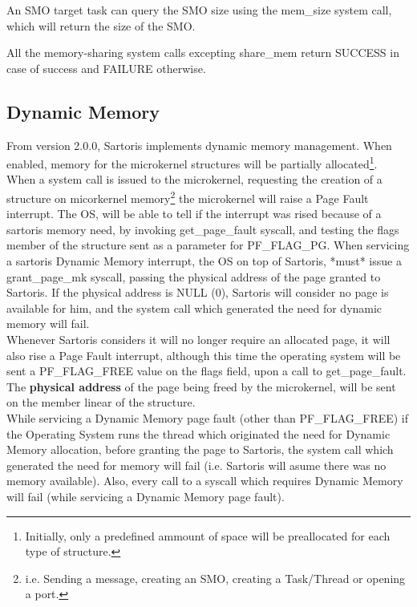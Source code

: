 \documentclass[11pt, letterpaper, twoside, english]{book}
\begin{document}
An SMO target task can query the SMO size using the \textsf{mem\_size} system call, which will return the size of the SMO.

All the memory-sharing system calls excepting \textsf{share\_mem} return SUCCESS in case of success and FAILURE otherwise.

\subsection{Dynamic Memory} \label{sec:dynamicmemory}

From version \textsf{2.0.0}, Sartoris implements dynamic memory management. When enabled, memory for the microkernel structures will be partially allocated\footnote{Initially, only a predefined ammount of space will be preallocated for each type of structure.}.\\

When a system call is issued to the microkernel, requesting the creation of a structure on micorkernel memory\footnote{i.e. Sending a message, creating an SMO, creating a Task/Thread or opening a port.} the microkernel will raise a Page Fault interrupt. The OS, will be able to tell if the interrupt was rised because of a sartoris memory need, by invoking \textsf{get\_page\_fault} syscall, and testing the flags member of the structure sent as a parameter for \textsf{PF\_FLAG\_PG}. When servicing a sartoris Dynamic Memory interrupt, the OS on top of Sartoris, *must* issue a \textsf{grant\_page\_mk} syscall, passing the physical address of the page granted to Sartoris. If the physical address is NULL (0), Sartoris will consider no page is available for him, and the system call which generated the need for dynamic memory will fail.\\ 
Whenever Sartoris considers it will no longer require an allocated page, it will also rise a Page Fault interrupt, although this time the operating system will be sent a \textsf{PF\_FLAG\_FREE} value on the \textsf{flags} field, upon a call to \textsf{get\_page\_fault}. The \textbf{physical address} of the page being freed by the microkernel, will be sent on the member \textsf{linear} of the structure.\\

While servicing a Dynamic Memory page fault (other than \textsf{PF\_FLAG\_FREE}) if the Operating System runs the thread which originated the need for Dynamic Memory allocation, before granting the page to Sartoris, the system call which generated the need for memory will fail (i.e. Sartoris will asume there was no memory available). Also, every call to a syscall which requires Dynamic Memory will fail (while servicing a Dynamic Memory page fault).
\end{document}

